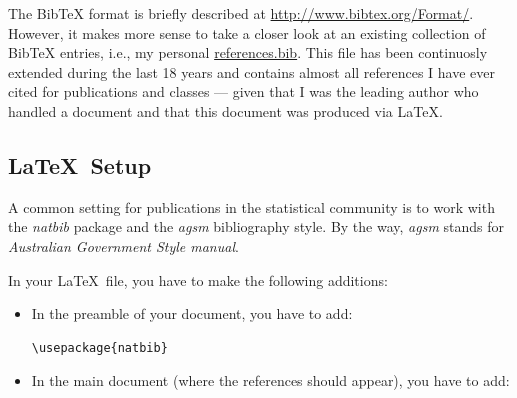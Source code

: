 \documentclass[12pt]{article}
\begin{document}
The BibTeX format is briefly described at \url{http://www.bibtex.org/Format/}.
However, it makes more sense to take a closer look at an existing
collection of BibTeX entries, i.e., my personal
\url{references.bib}.
This file has been continuosly extended during the last 18 years and
contains almost all references I have ever cited for publications
and classes --- given that I was the leading author who handled a
document and that this document was produced via \LaTeX.


\subsection{\LaTeX\ Setup}

A common setting for publications in the statistical community is to work
with the {\it natbib} package and the {\it agsm} bibliography style.
By the way, {\it agsm} stands for {\it Australian Government Style manual}.
 
In your \LaTeX\ file, you have to make the following additions:
\begin{itemize}

\item In the preamble of your document, you have to add:
\begin{verbatim}
\usepackage{natbib}
\end{verbatim}

\item In the main document (where the references should appear), you have to add:
\begin{verbatim}


\end{verbatim}
\end{itemize}
\end{document}
